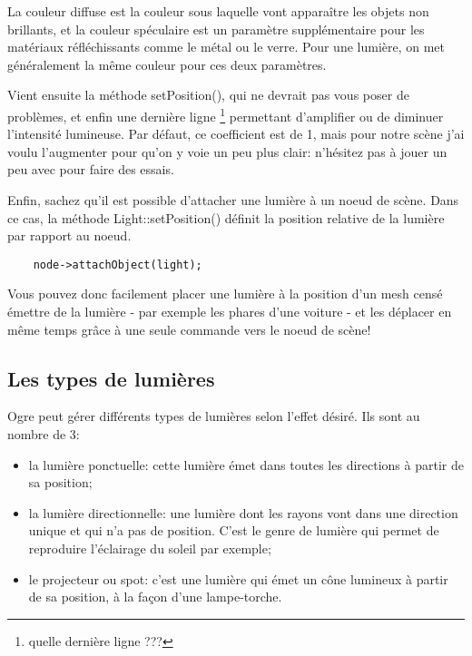 \documentclass[10pt,a4paper]{report}
\begin{document}
La couleur diffuse est la couleur sous laquelle vont appara\^itre les objets non brillants, et la couleur sp\'eculaire est un param\`etre suppl\'ementaire pour les mat\'eriaux r\'efl\'echissants comme le m\'etal ou le verre. Pour une lumi\`ere, on met g\'en\'eralement la m\^eme couleur pour ces deux param\`etres.

Vient ensuite la m\'ethode setPosition(), qui ne devrait pas vous poser de probl\`emes, et enfin une derni\`ere ligne \footnote{quelle derni\`ere ligne ???} permettant d'amplifier ou de diminuer l'intensit\'e lumineuse. Par d\'efaut, ce coefficient est de 1, mais pour notre sc\`ene j'ai voulu l'augmenter pour qu'on y voie un peu plus clair: n'h\'esitez pas \`{a} jouer un peu avec pour faire des essais.

Enfin, sachez qu'il est possible d'attacher une lumi\`ere \`{a} un noeud de sc\`ene. Dans ce cas, la m\'ethode Light::setPosition() d\'efinit la position relative de la lumi\`ere par rapport au noeud.
\begin{lstlisting}
	node->attachObject(light);
\end{lstlisting}


Vous pouvez donc facilement placer une lumi\`ere \`{a} la position d'un mesh cens\'e \'emettre de la lumi\`ere - par exemple les phares d'une voiture - et les d\'eplacer en m\^eme temps gr\^{a}ce \`{a} une seule commande vers le noeud de sc\`ene!





\subsection{Les types de lumi\`eres}

Ogre peut g\'erer diff\'erents types de lumi\`eres selon l'effet d\'esir\'e. Ils sont au nombre de 3:

\begin{itemize}
\item la lumi\`ere ponctuelle: cette lumi\`ere \'emet dans toutes les directions \`{a} partir de sa position;
\item la lumi\`ere directionnelle: une lumi\`ere dont les rayons vont dans une direction unique et qui n'a pas de position. C'est le genre de lumi\`ere qui permet de reproduire l'\'eclairage du soleil par exemple;
\item le projecteur ou spot: c'est une lumi\`ere qui \'emet un c\^one lumineux \`{a} partir de sa position, \`{a} la fa\c{c}on d'une lampe-torche.
\end{itemize}
    
\end{document}
